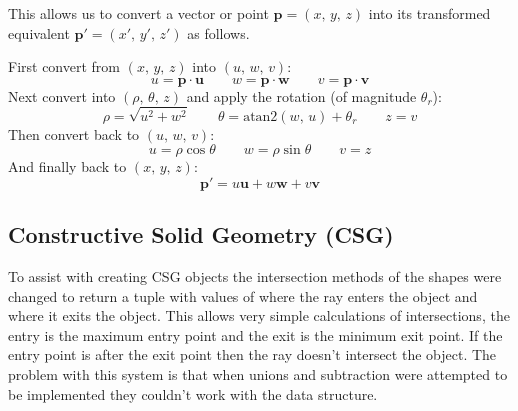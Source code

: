       This allows us to convert a vector or point $\mathbf{p} =
      \left(x,\,y,\,z\right)$ into its transformed equivalent $\mathbf{p}' =
      \left(x',\,y',\,z'\right)$ as follows.

      \noindent First convert from $\left(x,\,y,\,z\right)$ into $\left(u,\,w,\,v\right)$:
      \[ u = \mathbf{p} \cdot \mathbf{u} \qquad w = \mathbf{p} \cdot \mathbf{w}
         \qquad v = \mathbf{p} \cdot \mathbf{v} \]
      Next convert into $\left(\rho,\,\theta,\,z\right)$ and apply the rotation
      (of magnitude $\theta_r$):
      \[ \rho = \sqrt{u ^2 + w ^2} \qquad \theta =
      \textrm{atan2}\left(w,\,u\right) + \theta_r \qquad z = v \]
      Then convert back to $\left(u,\,w,\,v\right)$:
      \[ u = \rho\cos\theta \qquad w = \rho\sin\theta \qquad v = z \]
      And finally back to $\left(x,\,y,\,z\right)$:
      \[ \mathbf{p}' = u \mathbf{u} + w \mathbf{w} + v \mathbf{v} \]

    \subsection{Constructive Solid Geometry (CSG)}
      To assist with creating CSG objects the intersection methods of the
      shapes were changed to return a tuple with values of where the ray enters
      the object and where it exits the object.  This allows very simple
      calculations of intersections, the entry is the maximum entry point and
      the exit is the minimum exit point.  If the entry point is after the exit
      point then the ray doesn't intersect the object.  The problem with this
      system is that when unions and subtraction were attempted to be
      implemented they couldn't work with the data structure.


